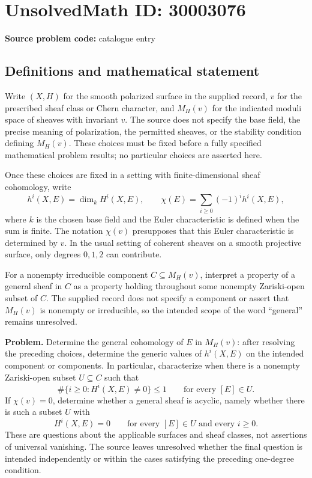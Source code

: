 \documentclass[11pt]{article}
\begin{document}
\section*{UnsolvedMath ID: 30003076}
\textbf{Source problem code:} catalogue entry
\subsection{Definitions and mathematical statement}
Write \((X,H)\) for the smooth polarized surface in the supplied record, \(v\) for the prescribed sheaf class or Chern character, and \(M_H(v)\) for the indicated moduli space of sheaves with invariant \(v\). The source does not specify the base field, the precise meaning of polarization, the permitted sheaves, or the stability condition defining \(M_H(v)\). These choices must be fixed before a fully specified mathematical problem results; no particular choices are asserted here.

Once these choices are fixed in a setting with finite-dimensional sheaf cohomology, write
\[
 h^i(X,E)=\dim_k H^i(X,E),
 \qquad
 \chi(E)=\sum_{i\geq 0}(-1)^i h^i(X,E),
\]
where \(k\) is the chosen base field and the Euler characteristic is defined when the sum is finite. The notation \(\chi(v)\) presupposes that this Euler characteristic is determined by \(v\). In the usual setting of coherent sheaves on a smooth projective surface, only degrees \(0,1,2\) can contribute.

For a nonempty irreducible component \(C\subseteq M_H(v)\), interpret a property of a general sheaf in \(C\) as a property holding throughout some nonempty Zariski-open subset of \(C\). The supplied record does not specify a component or assert that \(M_H(v)\) is nonempty or irreducible, so the intended scope of the word ``general'' remains unresolved.

\textbf{Problem.} Determine the general cohomology of \(E\) in \(M_H(v)\): after resolving the preceding choices, determine the generic values of \(h^i(X,E)\) on the intended component or components. In particular, characterize when there is a nonempty Zariski-open subset \(U\subseteq C\) such that
\[
 \#\{i\geq 0:H^i(X,E)\neq 0\}\leq 1
 \qquad\text{for every }[E]\in U.
\]
If \(\chi(v)=0\), determine whether a general sheaf is acyclic, namely whether there is such a subset \(U\) with
\[
 H^i(X,E)=0
 \qquad\text{for every }[E]\in U\text{ and every }i\geq 0.
\]
These are questions about the applicable surfaces and sheaf classes, not assertions of universal vanishing. The source leaves unresolved whether the final question is intended independently or within the cases satisfying the preceding one-degree condition.
\end{document}
